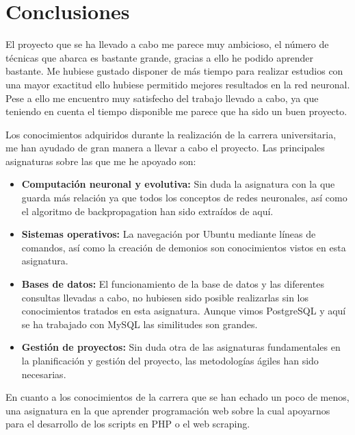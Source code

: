 
\section{Conclusiones}

El proyecto que se ha llevado a cabo me parece muy ambicioso, el número de técnicas que abarca es bastante grande, gracias a ello he podido aprender bastante.
Me hubiese gustado disponer de más tiempo para realizar estudios con una mayor exactitud ello hubiese permitido mejores resultados en la red neuronal. Pese a ello me encuentro muy satisfecho del trabajo llevado a cabo, ya que teniendo en cuenta el tiempo disponible me parece que ha sido un buen proyecto.

Los conocimientos adquiridos durante la realización de la carrera universitaria, me han ayudado de gran manera a llevar a cabo el proyecto. Las principales asignaturas sobre las que me he apoyado son:

\begin{itemize}
\item \textbf{Computación neuronal y evolutiva:} Sin duda la asignatura con la que guarda más relación ya que todos los conceptos de redes neuronales, así como el algoritmo de backpropagation han sido extraídos de aquí.

\item \textbf{Sistemas operativos: } La navegación por Ubuntu mediante líneas de comandos, así como la creación de demonios son conocimientos vistos en esta asignatura.

\item \textbf{Bases de datos: }El funcionamiento de la base de datos y las diferentes consultas llevadas a cabo, no hubiesen sido posible realizarlas sin los conocimientos tratados en esta asignatura. Aunque vimos PostgreSQL y aquí se ha trabajado con MySQL las similitudes son grandes.

\item \textbf{Gestión de proyectos: } Sin duda otra de las asignaturas fundamentales en la planificación y gestión del proyecto, las metodologías ágiles han sido necesarias.

\end{itemize}

En cuanto a los conocimientos de la carrera que se han echado un poco de menos, una asignatura en la que aprender programación web sobre la cual apoyarnos para el desarrollo de los scripts en PHP o el web scraping.
